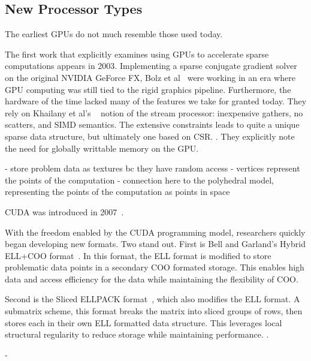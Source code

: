 \subsection{New Processor Types}

The earliest GPUs do not much resemble those used today.

The first work that explicitly examines using GPUs to accelerate sparse computations appears in 2003. 
Implementing a sparse conjugate gradient solver on the original NVIDIA GeForce FX, Bolz et al~\cite{bolz2003sparse} were working in an era where GPU computing was still tied to the rigid graphics pipeline. 
Furthermore, the hardware of the time lacked many of the features we take for granted today.
They rely on Khailany et al's ~\cite{findit} notion of the stream processor: inexpensive gathers, no scatters, and SIMD semantics. 
The extensive constraints leads to quite a unique sparse data structure, but ultimately one based on CSR. .
They explicitly note the need for globally writtable memory on the GPU.

\cite{fan2004gpu}
- store problem data as textures bc they have random access
- vertices represent the points of the computation
- connection here to the polyhedral model, representing the points of the computation as points in space


CUDA was introduced in 2007~\cite{cuda2007v1.0}.

With the freedom enabled by the CUDA programming model, researchers quickly began developing new formats.
Two stand out. 
First is Bell and Garland's Hybrid ELL+COO format~\cite{bell2009implementing,bell2008efficient}.
In this format, the ELL format is modified to store problematic data points in a secondary COO formated storage. 
This enables high data and access efficiency for the data while maintaining the flexibility of COO.

Second is the Sliced ELLPACK format~\cite{monakov2010automatically}, which also modifies the ELL format.
A submatrix scheme, this format breaks the matrix into sliced groups of rows, then stores each in their own ELL formatted data structure. 
This leverages local structural regularity to reduce storage while maintaining performance. 
. 




\cite{williams2007optimization}
- 



